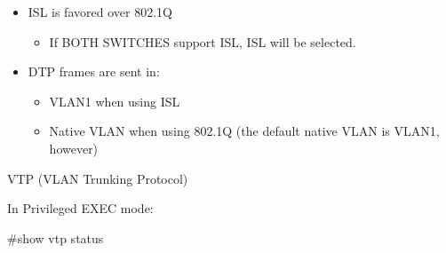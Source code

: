 \begin{itemize}
\tightlist
\item
  ISL is favored over 802.1Q

  \begin{itemize}
  \tightlist
  \item
    If BOTH SWITCHES support ISL, ISL will be selected.
  \end{itemize}
\item
  DTP frames are sent in:

  \begin{itemize}
  \tightlist
  \item
    VLAN1 when using ISL
  \item
    Native VLAN when using 802.1Q (the default native VLAN is VLAN1,
    however)
  \end{itemize}
\end{itemize}

VTP (VLAN Trunking Protocol)

In Privileged EXEC mode:

\begin{tipbox}

\#show vtp status

\end{tipbox}

